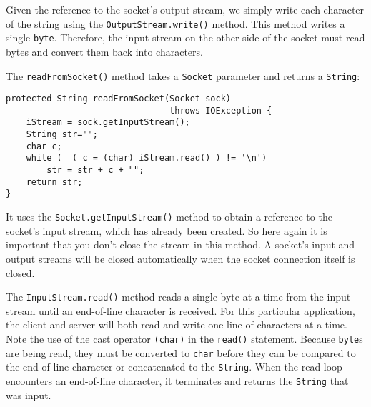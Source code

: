 

Given the reference to the socket's output stream, we simply write
each character of the string using the {\tt OutputStream.write()}
method.  This method writes a single {\tt byte}. Therefore, the input
stream on the other side of the socket must read bytes and convert
them back into characters.


\noindent The {\tt readFromSocket()} method takes a {\tt Socket} parameter
and returns a {\tt String}:

\begin{jjjlisting}
\begin{lstlisting}
protected String readFromSocket(Socket sock) 
                                throws IOException {
    iStream = sock.getInputStream();
    String str="";
    char c;
    while (  ( c = (char) iStream.read() ) != '\n')
        str = str + c + "";
    return str;
}
\end{lstlisting}
\end{jjjlisting}


\noindent It uses the {\tt Socket.getInputStream()} method to obtain a
reference to the socket's input stream, which has already been
created.   So here again it is important that you don't close the
stream in this method.  A socket's input and output streams will be
closed automatically when the socket connection itself is closed.

The {\tt InputStream.read()} method reads a single byte at a time from
the input stream until an end-of-line character is received.  For this
particular application, the client and server will both read and write
one line of characters at a time.  Note the use of the cast operator
{\tt (char)} in the {\tt read()} statement.   Because {\tt byte}s are
being read, they must be converted to {\tt char} before they can be
compared to the end-of-line character or concatenated to the
{\tt String}. When the read loop encounters an end-of-line character, it
terminates and returns the {\tt String} that was input.

